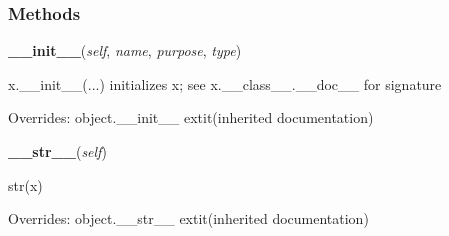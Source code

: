
  \subsubsection{Methods}

    \vspace{0.5ex}

\hspace{.8\funcindent}\begin{boxedminipage}{\funcwidth}

    \raggedright \textbf{\_\_init\_\_}(\textit{self}, \textit{name}, \textit{purpose}, \textit{type})

\setlength{\parskip}{2ex}
    x.\_\_init\_\_(...) initializes x; see x.\_\_class\_\_.\_\_doc\_\_ for 
    signature

\setlength{\parskip}{1ex}
      Overrides: object.\_\_init\_\_ 	extit{(inherited documentation)}

    \end{boxedminipage}

    \vspace{0.5ex}

\hspace{.8\funcindent}\begin{boxedminipage}{\funcwidth}

    \raggedright \textbf{\_\_str\_\_}(\textit{self})

\setlength{\parskip}{2ex}
    str(x)

\setlength{\parskip}{1ex}
      Overrides: object.\_\_str\_\_ 	extit{(inherited documentation)}

    \end{boxedminipage}

    \label{keyczar:keydata:KeyMetadata:AddVersion}

    \vspace{0.5ex}

